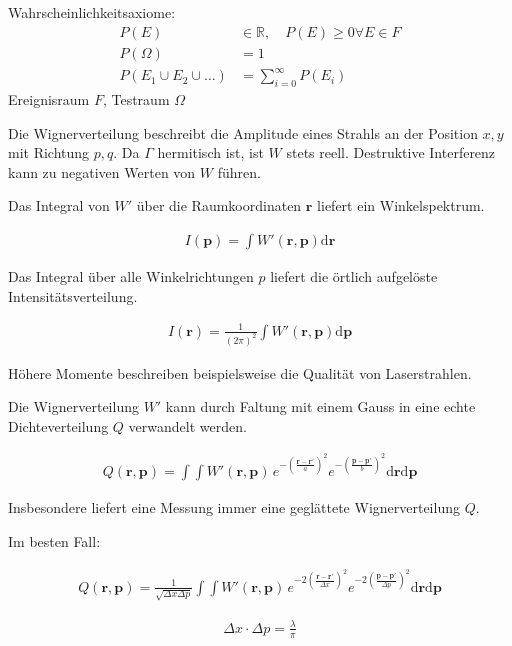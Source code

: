 \documentclass{article}
\newcommand{\vect}[1]{\mathbf{#1}}
\renewcommand{\r}{\vect r}
\newcommand{\p}{\vect p}
\begin{document}
Wahrscheinlichkeitsaxiome:
\begin{align}
  P(E)&\in\mathbb{R},\quad P(E)\ge 0 \forall E \in F\\
  P(\Omega) &= 1\\
  P(E_1\cup E_2\cup\ldots) &= \sum_{i=0}^\infty P(E_i)
\end{align}
Ereignisraum $F$, Testraum $\Omega$


Die Wignerverteilung beschreibt die Amplitude eines Strahls an der
Position $x, y$ mit Richtung $p, q$. Da $\Gamma$ hermitisch ist, ist
$W$ stets reell. Destruktive Interferenz kann zu negativen Werten von
$W$ f\"uhren.

Das Integral von $W'$ \"uber die Raumkoordinaten $\r$ liefert ein
Winkelspektrum.

\begin{align}
  I(\p) = \int W'(\r,\p) \textrm{d}\r
\end{align}

Das Integral \"uber alle Winkelrichtungen $p$ liefert
die \"ortlich aufgel\"oste Intensit\"atsverteilung.

\begin{align}
  I(\r) = \frac{1}{(2\pi)^2} \int W'(\r,\p) \textrm{d}\p
\end{align}

H\"ohere Momente beschreiben beispielsweise die Qualit\"at von
Laserstrahlen.

Die Wignerverteilung $W'$ kann durch Faltung mit einem Gauss in eine
echte Dichteverteilung $Q$ verwandelt werden.

\begin{align}
  Q(\r,\p) = \int\int W'(\r,\p)\, e^{-\left(\frac{\r-\r'}{a}\right)^2} e^{-\left(\frac{\p-\p'}{b}\right)^2}\textrm{d}\r\textrm{d}\p
\end{align}

Insbesondere liefert eine Messung immer eine gegl\"attete
Wignerverteilung $Q$.


Im besten Fall: 

\begin{align}
  Q(\r,\p) = \frac{1}{\sqrt{\Delta x \Delta p }}\int\int W'(\r,\p)\, e^{-2 \left(\frac{\r-\r'}{\Delta x}\right)^2} e^{- 2 \left(\frac{\p-\p'}{\Delta p}\right)^2}\textrm{d}\r\textrm{d}\p
\end{align}

\begin{align}
  \Delta x \cdot \Delta p = \frac{\lambda}{\pi}
\end{align}
\end{document}
